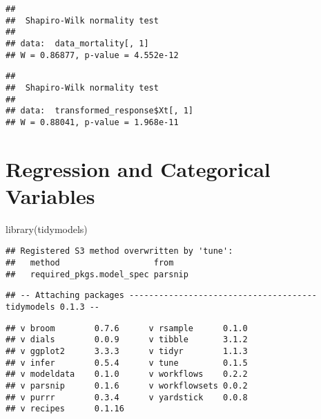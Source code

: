 \documentclass[
]{book}
\newenvironment{Shaded}{\begin{snugshade}}{\end{snugshade}}
\newcommand{\DecValTok}[1]{\textcolor[rgb]{0.00,0.00,0.81}{#1}}
\newcommand{\FunctionTok}[1]{\textcolor[rgb]{0.00,0.00,0.00}{#1}}
\newcommand{\NormalTok}[1]{#1}
\newcommand{\SpecialCharTok}[1]{\textcolor[rgb]{0.00,0.00,0.00}{#1}}
\begin{document}
\begin{verbatim}
## 
##  Shapiro-Wilk normality test
## 
## data:  data_mortality[, 1]
## W = 0.86877, p-value = 4.552e-12
\end{verbatim}

\begin{Shaded}
\end{Shaded}

\begin{verbatim}
## 
##  Shapiro-Wilk normality test
## 
## data:  transformed_response$Xt[, 1]
## W = 0.88041, p-value = 1.968e-11
\end{verbatim}

\hypertarget{regression-and-categorical-variables}{%
\section{Regression and Categorical Variables}\label{regression-and-categorical-variables}}

\begin{Shaded}
\begin{Highlighting}[]
\FunctionTok{library}\NormalTok{(tidymodels)}
\end{Highlighting}
\end{Shaded}

\begin{verbatim}
## Registered S3 method overwritten by 'tune':
##   method                   from   
##   required_pkgs.model_spec parsnip
\end{verbatim}

\begin{verbatim}
## -- Attaching packages -------------------------------------- tidymodels 0.1.3 --
\end{verbatim}

\begin{verbatim}
## v broom        0.7.6      v rsample      0.1.0 
## v dials        0.0.9      v tibble       3.1.2 
## v ggplot2      3.3.3      v tidyr        1.1.3 
## v infer        0.5.4      v tune         0.1.5 
## v modeldata    0.1.0      v workflows    0.2.2 
## v parsnip      0.1.6      v workflowsets 0.0.2 
## v purrr        0.3.4      v yardstick    0.0.8 
## v recipes      0.1.16
\end{verbatim}
\end{document}
